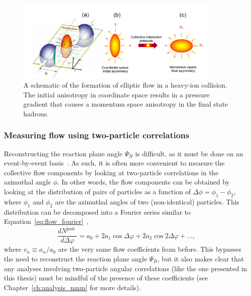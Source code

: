 \begin{figure}[ht]
    \centering
    \includegraphics[width=0.9\textwidth]{figures/introduction/elliptic_flow.png}
    \caption{A schematic of the formation of elliptic flow in a heavy-ion collision. The initial anisotropy in coordinate space results in a pressure gradient that causes a momentum space anisotropy in the final state hadrons.}
    \label{fig:elliptic_flow}
\end{figure}


\subsubsection{Measuring flow using two-particle correlations}
\label{sec:v2_twoparticle}
Reconstructing the reaction plane angle $\Psi_R$ is difficult, as it must be done on an event-by-event basis~\cite{Flow24}. As such, it is often more convenient to measure the collective flow components by looking at two-particle correlations in the azimuthal angle $\phi$. In other words, the flow components can be obtained by looking at the distribution of pairs of particles as a function of $\Delta\phi = \phi_1 - \phi_2$, where $\phi_1$ and $\phi_2$ are the azimuthal angles of two (non-identical) particles. This distribution can be decomposed into a Fourier series similar to Equation~\ref{eq:flow_fourier}~\cite{FlowDphi}, 
%
\begin{equation}
    \label{eq:flow_dphi}
    \frac{d N^{\text {pair }}}{d \Delta \varphi}=a_0+2 a_1 \cos \Delta \varphi+2 a_2 \cos 2 \Delta \varphi+\ldots,
\end{equation}
where $v_n \equiv a_n/a_0$ are the very same flow coefficients from before. This bypasses the need to reconstruct the reaction plane angle $\Psi_R$, but it also makes clear that any analyses involving two-particle angular correlations (like the one presented in this thesis) must be mindful of the presence of these coefficients (see Chapter~\ref{ch:analysis_mnm} for more details).

\clearpage

